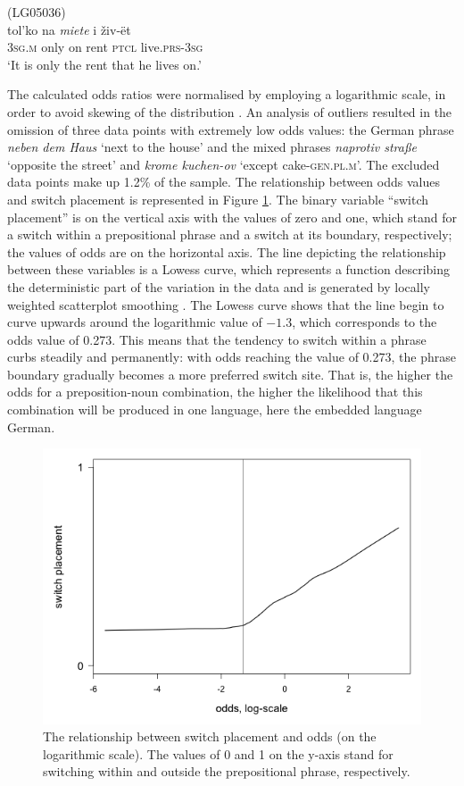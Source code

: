 \ea
(LG05036)\label{ex:5:13}\\
 {tol'ko} {na} \textit{miete} {i} {živ-ët}\\
	{3\textsc{sg.m}} only on rent \textsc{ptcl} live.\textsc{prs-3sg}\\
\glt `It is only the rent that he lives on.'
\z

The calculated odds ratios were normalised by employing a logarithmic scale, in order to avoid skewing of the distribution \citep[cf.][31]{baayen-analyzing}. An analysis of outliers \citep[cf.][258]{gries2009} resulted in the omission of three data points with extremely low odds values: the German phrase \textit{neben dem Haus} `next to the house' and the mixed phrases \textit{naprotiv straße} `opposite the street' and \textit{krome kuchen-ov} `except cake-\textsc{gen.pl.m}'. The excluded data points make up 1.2\% of the sample. The relationship between odds values and switch placement is represented in Figure \ref{fig:5:2}. The binary variable “switch placement” is on the vertical axis with the values of zero and one, which stand for a switch within a prepositional phrase and a switch at its boundary, respectively; the values of odds are on the horizontal axis. The line depicting the relationship between these variables is a Lowess curve, which represents a function describing the deterministic part of the variation in the data and is generated by locally weighted scatterplot smoothing \citep{lowess}. The Lowess curve shows that the line begin to curve upwards around the logarithmic value of $-1.3$, which corresponds to the odds value of 0.273. This means that the tendency to switch within a phrase curbs steadily and permanently: with odds reaching the value of 0.273, the phrase boundary gradually becomes a more preferred switch site. That is, the higher the odds for a preposition-noun combination, the higher the likelihood that this combination will be produced in one language, here the embedded language German.

\begin{figure}
	   	\includegraphics[scale=0.5]{figures/5-Figure_2.png}	
		\caption{The relationship between switch placement and odds (on the logarithmic scale). The values of 0 and 1 on the y-axis stand for switching within and outside the prepositional phrase, respectively.}
	\label{fig:5:2}
\end{figure}

